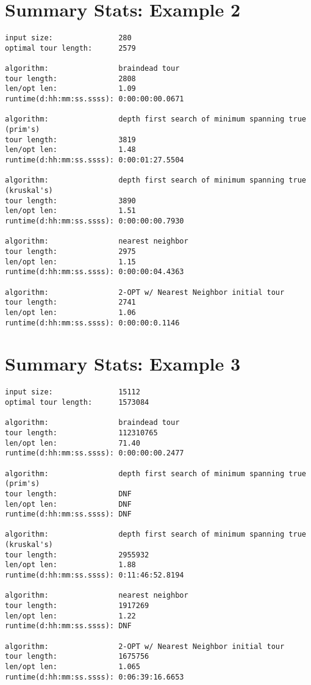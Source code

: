 \documentclass[12pt]{article}
\begin{document}
\newpage
\section*{Summary Stats: Example 2}
\begin{verbatim}
input size:               280
optimal tour length:      2579

algorithm:                braindead tour
tour length:              2808
len/opt len:              1.09
runtime(d:hh:mm:ss.ssss): 0:00:00:00.0671

algorithm:                depth first search of minimum spanning true (prim's) 
tour length:              3819
len/opt len:              1.48
runtime(d:hh:mm:ss.ssss): 0:00:01:27.5504

algorithm:                depth first search of minimum spanning true (kruskal's) 
tour length:              3890
len/opt len:              1.51
runtime(d:hh:mm:ss.ssss): 0:00:00:00.7930

algorithm:                nearest neighbor 
tour length:              2975
len/opt len:              1.15
runtime(d:hh:mm:ss.ssss): 0:00:00:04.4363

algorithm:                2-OPT w/ Nearest Neighbor initial tour
tour length:              2741
len/opt len:              1.06
runtime(d:hh:mm:ss.ssss): 0:00:00:0.1146
\end{verbatim}

\newpage
\section*{Summary Stats: Example 3}
\begin{verbatim}
input size:               15112
optimal tour length:      1573084

algorithm:                braindead tour
tour length:              112310765
len/opt len:              71.40
runtime(d:hh:mm:ss.ssss): 0:00:00:00.2477

algorithm:                depth first search of minimum spanning true (prim's) 
tour length:              DNF
len/opt len:              DNF
runtime(d:hh:mm:ss.ssss): DNF

algorithm:                depth first search of minimum spanning true (kruskal's) 
tour length:              2955932
len/opt len:              1.88
runtime(d:hh:mm:ss.ssss): 0:11:46:52.8194

algorithm:                nearest neighbor 
tour length:              1917269
len/opt len:              1.22
runtime(d:hh:mm:ss.ssss): DNF

algorithm:                2-OPT w/ Nearest Neighbor initial tour
tour length:              1675756
len/opt len:              1.065
runtime(d:hh:mm:ss.ssss): 0:06:39:16.6653
\end{verbatim}
\end{document}
